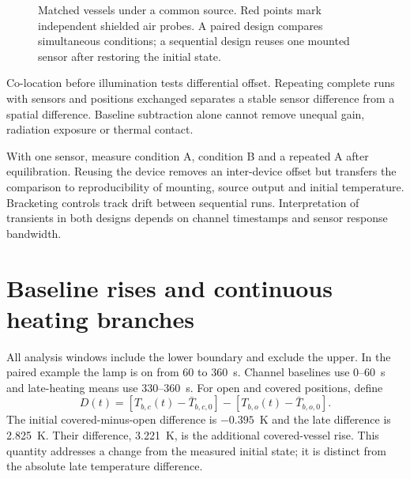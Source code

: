\begin{figure}[t]
\centering
{}
\caption{Matched vessels under a common source. Red points mark independent shielded air probes. A paired design compares simultaneous conditions; a sequential design reuses one mounted sensor after restoring the initial state.}
\label{fig:greenhouse-apparatus}
\end{figure}

Co-location before illumination tests differential offset. Repeating complete runs with sensors and positions exchanged separates a stable sensor difference from a spatial difference. Baseline subtraction alone cannot remove unequal gain, radiation exposure or thermal contact.

With one sensor, measure condition A, condition B and a repeated A after equilibration. Reusing the device removes an inter-device offset but transfers the comparison to reproducibility of mounting, source output and initial temperature. Bracketing controls track drift between sequential runs. Interpretation of transients in both designs depends on channel timestamps and sensor response bandwidth.

\section{Baseline rises and continuous heating branches}
All analysis windows include the lower boundary and exclude the upper. In the paired example the lamp is on from 60 to 360~s. Channel baselines use 0--60~s and late-heating means use 330--360~s. For open and covered positions, define
\begin{equation}
 D(t)=[T_{b,c}(t)-\bar T_{b,c,0}]
      -[T_{b,o}(t)-\bar T_{b,o,0}].
 \label{eq:greenhouse-difference}
\end{equation}
The initial covered-minus-open difference is $-0.395$~K and the late difference is 2.825~K. Their difference, 3.221~K, is the additional covered-vessel rise. This quantity addresses a change from the measured initial state; it is distinct from the absolute late temperature difference.

